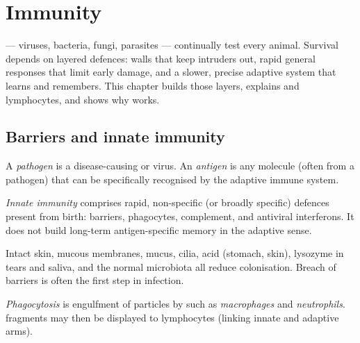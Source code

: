 \chapter{Immunity}\label{ch:g12:immunity}

 --- viruses, bacteria, fungi, parasites --- continually test
every animal. Survival depends on layered defences: walls that keep
intruders out, rapid general responses that limit early damage, and a
slower, precise adaptive system that learns and remembers. This chapter
builds those layers, explains  and lymphocytes, and shows why
 works.

\section{Barriers and innate immunity}

\begin{definition}\label{def:g12:immunity:pathogen}
A \emph{pathogen} is a disease-causing  or
virus. An \emph{antigen} is any molecule (often from a
pathogen) that can be specifically recognised by the adaptive immune
system.
\end{definition}

\begin{definition}\label{def:g12:immunity:innate}
\emph{Innate immunity} comprises rapid, non-specific
(or broadly specific) defences present from birth: barriers, phagocytes,
complement,  and antiviral interferons. It does not build
long-term antigen-specific memory in the adaptive sense.
\end{definition}

\begin{proposition}
\label{prop:g12:immunity:barriers}
Intact skin, mucous membranes, mucus, cilia, acid (stomach, skin),
lysozyme in tears and saliva, and the normal microbiota all reduce
colonisation. Breach of barriers is often the first step in infection.
\end{proposition}
\admitted

\begin{definition}[Phagocytosis]\label{def:g12:immunity:phagocytosis}
\emph{Phagocytosis} is engulfment of particles by
 such as \emph{macrophages} and
\emph{neutrophils}.  fragments may then be
displayed to lymphocytes (linking innate and adaptive arms).
\end{definition}

